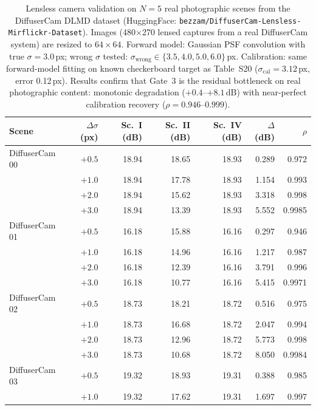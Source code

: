 \documentclass[11pt]{article}
\begin{document}
\begin{table}[htbp]
\centering
\caption{Lensless camera validation on $N{=}5$ real photographic scenes from the
DiffuserCam DLMD dataset \cite{Antipa2018} (HuggingFace: \texttt{bezzam/DiffuserCam-Lensless-Mirflickr-Dataset}).
Images (480$\times$270 lensed captures from a real DiffuserCam system) are resized to $64{\times}64$.
Forward model: Gaussian PSF convolution with true $\sigma{=}3.0$\,px; wrong $\sigma$ tested:
$\sigma_\mathrm{wrong} \in \{3.5, 4.0, 5.0, 6.0\}$\,px.
Calibration: same forward-model fitting on known checkerboard target as Table~S20
($\sigma_\mathrm{cal}{=}3.12$\,px, error 0.12\,px).
Results confirm that Gate~3 is the residual bottleneck on real photographic content: monotonic degradation ($+0.4$--$+8.1$\,dB)
with near-perfect calibration recovery ($\rho{=}0.946$--$0.999$).}
\label{tab:lensless_real}
\small
\begin{tabular}{l r r r r r r}
\toprule
Scene & $\Delta\sigma$ (px) & Sc.~I (dB) & Sc.~II (dB) & Sc.~IV (dB) & $\Delta$(dB) & $\rho$ \\
\midrule
DiffuserCam\,00 & $+0.5$ & 18.94 & 18.65 & 18.93 & 0.289 & 0.972 \\
                & $+1.0$ & 18.94 & 17.78 & 18.93 & 1.154 & 0.993 \\
                & $+2.0$ & 18.94 & 15.62 & 18.93 & 3.318 & 0.998 \\
                & $+3.0$ & 18.94 & 13.39 & 18.93 & 5.552 & 0.9985 \\
DiffuserCam\,01 & $+0.5$ & 16.18 & 15.88 & 16.16 & 0.297 & 0.946 \\
                & $+1.0$ & 16.18 & 14.96 & 16.16 & 1.217 & 0.987 \\
                & $+2.0$ & 16.18 & 12.39 & 16.16 & 3.791 & 0.996 \\
                & $+3.0$ & 16.18 & 10.77 & 16.16 & 5.415 & 0.9971 \\
DiffuserCam\,02 & $+0.5$ & 18.73 & 18.21 & 18.72 & 0.516 & 0.975 \\
                & $+1.0$ & 18.73 & 16.68 & 18.72 & 2.047 & 0.994 \\
                & $+2.0$ & 18.73 & 12.96 & 18.72 & 5.773 & 0.998 \\
                & $+3.0$ & 18.73 & 10.68 & 18.72 & 8.050 & 0.9984 \\
DiffuserCam\,03 & $+0.5$ & 19.32 & 18.93 & 19.31 & 0.388 & 0.985 \\
                & $+1.0$ & 19.32 & 17.62 & 19.31 & 1.697 & 0.997 \\

\end{tabular}
\end{table}
\end{document}
